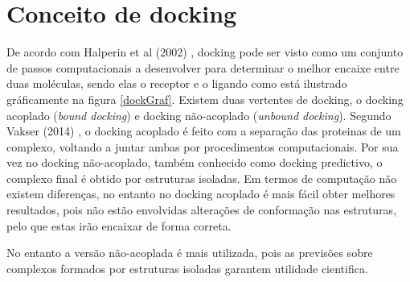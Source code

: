 \section{Conceito de docking}
De acordo com Halperin et al (2002) \cite{halperin}, docking pode ser visto como um conjunto de passos computacionais a desenvolver para determinar o melhor encaixe entre duas moléculas, sendo elas o receptor e o ligando como está ilustrado gráficamente na figura \ref{dockGraf}. 
%
Existem duas vertentes de docking, o docking acoplado (\textit{bound docking}) e docking não-acoplado (\textit{unbound docking}). Segundo Vakser (2014) \cite{vakser2014protein}, o docking acoplado é feito com a separação das proteinas de um complexo, voltando a juntar ambas por procedimentos computacionais. Por sua vez no docking não-acoplado, também conhecido como docking predictivo, o complexo final é obtido por estruturas isoladas. Em termos de computação não existem diferenças, no entanto no docking acoplado é mais fácil obter melhores resultados, pois não estão envolvidas alterações de conformação nas estruturas, pelo que estas irão encaixar de forma correta.  \par No entanto a versão não-acoplada é mais utilizada, pois as previsões sobre complexos formados por estruturas isoladas garantem utilidade cientifica.
